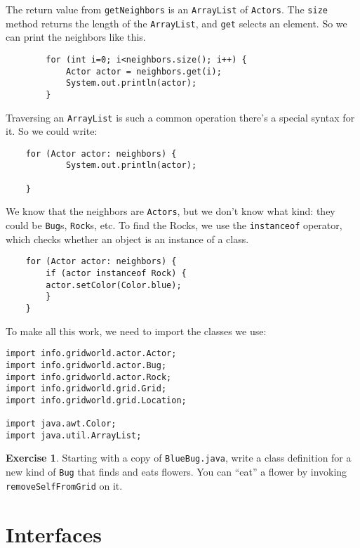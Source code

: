 \documentclass[12pt]{book}
\theoremstyle{definition}
\newtheorem{excz}{Exercise}[chapter]
\newenvironment{exercise}{\bigskip\begin{excz}\mbox{}}{\end{excz}}
\begin{document}
The return value from {\tt getNeighbors} is an {\tt ArrayList}
of {\tt Actors}.  The {\tt size} method returns the length of
the {\tt ArrayList}, and {\tt get} selects an element.  So
we can print the neighbors like this.

\begin{lstlisting}
        for (int i=0; i<neighbors.size(); i++) {
            Actor actor = neighbors.get(i);
            System.out.println(actor);
        }
\end{lstlisting}

Traversing an {\tt ArrayList} is such a common operation there's
a special syntax for it.  So we could write:

\begin{lstlisting}
	for (Actor actor: neighbors) {
            System.out.println(actor);

	}
\end{lstlisting}

We know that the neighbors are {\tt Actors}, but we don't know
what kind: they could be {\tt Bug}s, {\tt Rock}s, etc.
To find the Rocks, we use the {\tt instanceof} operator, which
checks whether an object is an instance of a class.

\begin{lstlisting}
	for (Actor actor: neighbors) {
	    if (actor instanceof Rock) {
		actor.setColor(Color.blue);
	    }
	}
\end{lstlisting}

To make all this work, we need to import the classes we use:

\begin{lstlisting}
import info.gridworld.actor.Actor;
import info.gridworld.actor.Bug;
import info.gridworld.actor.Rock;
import info.gridworld.grid.Grid;
import info.gridworld.grid.Location;

import java.awt.Color;
import java.util.ArrayList;
\end{lstlisting}

\begin{exercise}
Starting with a copy of {\tt BlueBug.java}, write a class definition
for a new kind of {\tt Bug} that finds and eats flowers.  You can
``eat'' a flower by invoking {\tt removeSelfFromGrid} on it.
\end{exercise}


\section{Interfaces}
\end{document}
